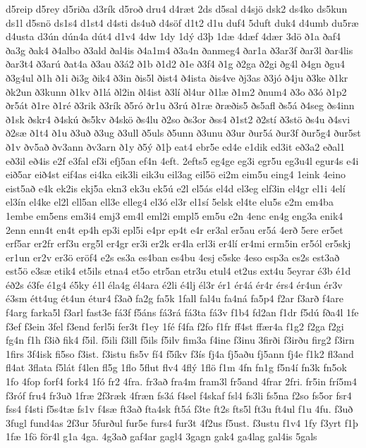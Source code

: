 {d5reip
d5rey
d5riða
d3rík
d5roð
dru4
d4ræt
2ds
d5sal
d4sjö
dsk2
ds4ko
ds5kun
ds1l
d5snö
ds1s4
d1st4
d4sti
ds4uð
d4söf
d1t2
d1u
duf4
5duft
duk4
d4umb
du5ræ
d4usta
d3ún
dún4a
dút4
d1v4
4dw
1dy
1dý
d3þ
1dæ
4dæf
4dær
3dö
ð1a
ðaf4
ða3g
ðak4
ð4albo
ð3ald
ðal4is
ð4a1m4
ð3a4n
ðanmeg4
ðar1a
ð3ar3f
ðar3l
ðar4lis
ðar3t4
ð3arú
ðat4a
ð3au
ð3á2
ð1b
ð1d2
ð1e
ð3f4
ð1g
ð2ga
ð2gi
ðg4l
ð4gn
ðgu4
ð3g4ul
ð1h
ð1i
ði3g
ðik4
ð3in
ðis5l
ðist4
ð4ista
ðis4ve
ðj3as
ð3jó
ð4ju
ð3ke
ð1kr
ðk2un
ð3kunn
ð1kv
ð1lá
ðl2in
ðl4ist
ð3lí
ðl4ur
ð1læ
ð1m2
ðnum4
ð3o
ð3ó
ð1p2
ðr5át
ð1re
ð1ré
ð3rik
ð3rík
ð5ró
ðr1u
ð3rú
ð1ræ
ðræðis5
ðs5afl
ðs5á
ð4seg
ðs4inn
ð1sk
ðskr4
ð4skú
ðs5kv
ð4skö
ðs4lu
ð2so
ðs3or
ðss4
ð1st2
ð2stí
ð3stö
ðs4u
ð4svi
ð2sæ
ð1t4
ð1u
ð3uð
ð3ug
ð3ull
ð5uls
ð5unn
ð3unu
ð3ur
ður5á
ður3f
ður5g4
ður5st
ð1v
ðv5að
ðv3ann
ðv3arn
ð1y
ð5ý
ð1þ
eat4
ebr5e
ed4e
e1dik
ed3it
eð3a2
eðal1
eð3il
eð4is
e2f
e3fal
ef3i
efj5an
ef4n
4eft.
2efts5
eg4ge
eg3i
egr5u
eg3u4l
egur4s
e4i
eið5ar
eið4st
eif4as
ei4ka
eik3li
eik3u
eil3ag
eil5ö
ei2m
eim5u
eing4
1eink
4eino
eist5að
e4k
ek2is
ekj5a
ekn3
ek3u
ek5ú
e2l
el5ás
el4d
el3eg
elf3in
el4gr
el1i
4elí
el3ín
el4ke
el2l
ell5an
ell3e
elleg4
el3ó
el3r
el1sí
5elsk
el4te
elu5s
e2m
em4ba
1embe
em5ens
em3i4
emj3
em4l
eml2i
empl5
em5u
e2n
4enc
en4g
eng3a
enik4
2enn
enn4t
en4t
ep4h
ep3i
epl5i
e4pr
ep4t
e4r
er3al
er5au
er5á
4erð
5ere
er5et
erf5ar
er2fr
erf3u
erg5l
er4gr
er3i
er2k
er4la
erl3i
er4lí
er4mi
erm5in
er5ól
er5skj
er1un
er2v
er3ö
eröf4
e2s
es3a
es4ban
es4bu
4esj
e5ske
4eso
esp3a
es2s
est3að
est5ö
e3sæ
etik4
et5ils
etna4
et5o
etr5an
etr3u
etul4
et2us
ext4u
5eyrar
é3b
é1d
éð2s
é3fe
é1g4
é5ky
é1l
éla4g
él4ara
é2li
é4lj
él3r
ér1
ér4á
ér4r
érs4
ér4un
ér3v
é3sm
étt4ug
ét4un
étur4
f3að
fa2g
fa5k
1fall
fal4u
fa4ná
fa5p4
f2ar
f3arð
f4are
f4arg
farka5l
f3arl
fast3e
fá3f
f5áns
fá3rá
fá3ta
fá3v
f1b4
fd2an
f1dr
f5dú
fða4l
1fe
f3ef
f3ein
3fel
f3end
ferl5i
fer3t
f1ey
1fé
f4fa
f2fo
f1fr
ff4st
ffær4a
f1g2
f2ga
f2gi
fg4n
f1h
f3ið
fik4
f5il.
f5ili
f3ill
f5ils
f5ilv
fim3a
f4ine
f3inu
3firði
f3irðu
firg2
f3irn
1firs
3f4isk
fi5so
f3ist.
f3istu
fis5v
fí4
f5íkv
f3ís
fj4a
fj5aðu
fj5ann
fj4e
f1k2
fl3and
fl4at
3flata
f5lát
f4len
fl5g
1flo
5flut
flv4
4flý
1flö
f1m
4fn
fn1g
f5n4í
fn3k
fn5ok
1fo
4fop
forf4
fork4
1fó
fr2
4fra.
fr3að
fra4m
fram3l
fr5and
4frar
2fri.
fr5in
frí5m4
f3róf
fru4
fr3uð
1fræ
2f3ræk
4fræn
fs3á
f4sel
f4skaf
fsl4
fs3li
fs5na
f2so
fs5or
fsr4
fss4
f4sti
f5s4tæ
fs1v
f4sæ
ft3að
fta4sk
ft5á
f3te
ft2s
fts5l
ft3u
ft4ul
f1u
4fu.
f3uð
3fugl
fund4as
2f3ur
5furðul
fur5e
furs4
fur3t
4f2us
f5ust.
f3ustu
f1v4
1fy
f3yrt
f1þ
1fæ
1fö
för4l
g1a
4ga.
4g3að
gaf4ar
gagl4
3gagn
gak4
ga4lag
gal4is
5gals
}
